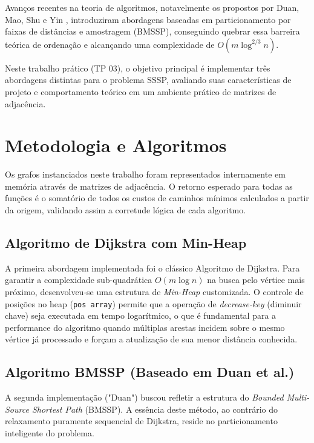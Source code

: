 \documentclass[12pt]{article}
\begin{document}
Avanços recentes na teoria de algoritmos, notavelmente os propostos por Duan, Mao, Shu e Yin \cite{duan2023focs}, introduziram abordagens baseadas em particionamento por faixas de distâncias e amostragem (BMSSP), conseguindo quebrar essa barreira teórica de ordenação e alcançando uma complexidade de $O(m \log^{2/3} n)$. 

Neste trabalho prático (TP 03), o objetivo principal é implementar três abordagens distintas para o problema SSSP, avaliando suas características de projeto e comportamento teórico em um ambiente prático de matrizes de adjacência.

\section{Metodologia e Algoritmos}
\label{sec:metodologia}

Os grafos instanciados neste trabalho foram representados internamente em memória através de matrizes de adjacência. O retorno esperado para todas as funções é o somatório de todos os custos de caminhos mínimos calculados a partir da origem, validando assim a corretude lógica de cada algoritmo.

\subsection{Algoritmo de Dijkstra com Min-Heap}
A primeira abordagem implementada foi o clássico Algoritmo de Dijkstra. Para garantir a complexidade sub-quadrática $O(m \log n)$ na busca pelo vértice mais próximo, desenvolveu-se uma estrutura de \textit{Min-Heap} customizada. 
O controle de posições no heap (\texttt{pos array}) permite que a operação de \textit{decrease-key} (diminuir chave) seja executada em tempo logarítmico, o que é fundamental para a performance do algoritmo quando múltiplas arestas incidem sobre o mesmo vértice já processado e forçam a atualização de sua menor distância conhecida.

\subsection{Algoritmo BMSSP (Baseado em Duan et al.)}
A segunda implementação ("Duan") buscou refletir a estrutura do \textit{Bounded Multi-Source Shortest Path} (BMSSP). A essência deste método, ao contrário do relaxamento puramente sequencial de Dijkstra, reside no particionamento inteligente do problema.
\end{document}
